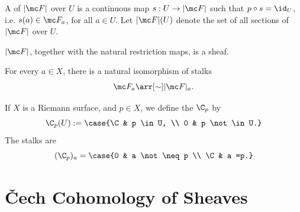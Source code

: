 \documentclass[11pt]{report}
\begin{document}
A  of $|\mc F|$ over $U$ is a continuous map $s:U \to |\mc F|$ such that $p \circ s=\id_U$, i.e. $s(a) \in \mc F_a$, for all $a \in U$. Let $|\mc F|(U)$ denote the set of all sections of $|\mc F|$ over $U$.

\begin{exercise}
    $|\mc F|$, together with the natural restriction maps, is a sheaf.
\end{exercise}

\begin{exercise}
    For every $a \in X$, there is a natural isomorphism of stalks
    \[
    \mc F_a \arr[\sim] |\mc F|_a.
    \]
\end{exercise}

\begin{ex}
    If $X$ is a Riemann surface, and $p \in X$, we define the  $\C_p$ by
    \[
    \C_p(U) := \case{\C & p \in U, \\ 0 & p \not \in U.}
    \]
    The stalks are
    \[
    (\C_p)_a = \case{0 & a \not \neq p \\ \C & a =p.}
    \]
\end{ex}

\section{\v{C}ech Cohomology of Sheaves}
\end{document}
